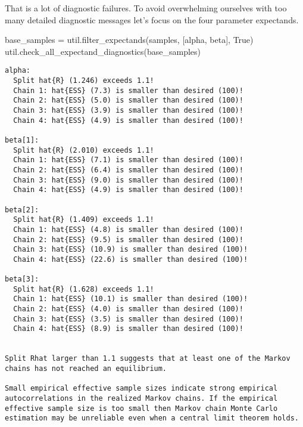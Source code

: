 \documentclass[
  letterpaper,
  DIV=11,
  numbers=noendperiod]{scrartcl}
\newenvironment{Shaded}{\begin{snugshade}}{\end{snugshade}}
\newcommand{\NormalTok}[1]{\textcolor[rgb]{0.00,0.23,0.31}{#1}}
\newcommand{\OperatorTok}[1]{\textcolor[rgb]{0.37,0.37,0.37}{#1}}
\newcommand{\StringTok}[1]{\textcolor[rgb]{0.13,0.47,0.30}{#1}}
\newcommand{\VariableTok}[1]{\textcolor[rgb]{0.07,0.07,0.07}{#1}}
\begin{document}
That is a lot of diagnostic failures. To avoid overwhelming ourselves
with too many detailed diagnostic messages let's focus on the four
parameter expectands.

\begin{Shaded}
\begin{Highlighting}[]
\NormalTok{base\_samples }\OperatorTok{=}\NormalTok{ util.filter\_expectands(samples, [}\StringTok{\textquotesingle{}alpha\textquotesingle{}}\NormalTok{, }\StringTok{\textquotesingle{}beta\textquotesingle{}}\NormalTok{], }\VariableTok{True}\NormalTok{)}
\NormalTok{util.check\_all\_expectand\_diagnostics(base\_samples)}
\end{Highlighting}
\end{Shaded}

\begin{verbatim}
alpha:
  Split hat{R} (1.246) exceeds 1.1!
  Chain 1: hat{ESS} (7.3) is smaller than desired (100)!
  Chain 2: hat{ESS} (5.0) is smaller than desired (100)!
  Chain 3: hat{ESS} (3.9) is smaller than desired (100)!
  Chain 4: hat{ESS} (4.9) is smaller than desired (100)!

beta[1]:
  Split hat{R} (2.010) exceeds 1.1!
  Chain 1: hat{ESS} (7.1) is smaller than desired (100)!
  Chain 2: hat{ESS} (6.4) is smaller than desired (100)!
  Chain 3: hat{ESS} (9.0) is smaller than desired (100)!
  Chain 4: hat{ESS} (4.9) is smaller than desired (100)!

beta[2]:
  Split hat{R} (1.409) exceeds 1.1!
  Chain 1: hat{ESS} (4.8) is smaller than desired (100)!
  Chain 2: hat{ESS} (9.5) is smaller than desired (100)!
  Chain 3: hat{ESS} (10.9) is smaller than desired (100)!
  Chain 4: hat{ESS} (22.6) is smaller than desired (100)!

beta[3]:
  Split hat{R} (1.628) exceeds 1.1!
  Chain 1: hat{ESS} (10.1) is smaller than desired (100)!
  Chain 2: hat{ESS} (4.0) is smaller than desired (100)!
  Chain 3: hat{ESS} (3.5) is smaller than desired (100)!
  Chain 4: hat{ESS} (8.9) is smaller than desired (100)!


Split Rhat larger than 1.1 suggests that at least one of the Markov
chains has not reached an equilibrium.
 
Small empirical effective sample sizes indicate strong empirical
autocorrelations in the realized Markov chains. If the empirical
effective sample size is too small then Markov chain Monte Carlo
estimation may be unreliable even when a central limit theorem holds.
 
\end{verbatim}
\end{document}
